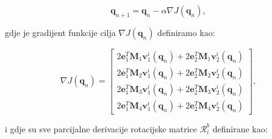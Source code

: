\documentclass[times, utf8, diplomski, numeric]{templates/template}
\begin{document}
{{{{                \begin{equation}
                \label{eq:grad_des}
                    \boldsymbol{q}_{n+1} = \boldsymbol{q}_n - \alpha\nabla J(\boldsymbol{q}_n),
                \end{equation}

                gdje je gradijent funkcije cilja $\nabla J(\boldsymbol{q}_n)$ definiramo kao:

                \begin{equation}
                    \nabla J(\boldsymbol{q}_n) = 
                    \begin{bmatrix}
                        2 \boldsymbol{e}_1^T \boldsymbol{M}_1 \boldsymbol{v}_1^i(\boldsymbol{q}_n) + 2 \boldsymbol{e}_2^T \boldsymbol{M}_1 \boldsymbol{v}_2^i(\boldsymbol{q}_n) \\
                        2 \boldsymbol{e}_1^T \boldsymbol{M}_2 \boldsymbol{v}_1^i(\boldsymbol{q}_n) + 2 \boldsymbol{e}_2^T \boldsymbol{M}_2 \boldsymbol{v}_2^i(\boldsymbol{q}_n) \\
                        2 \boldsymbol{e}_1^T \boldsymbol{M}_3 \boldsymbol{v}_1^i(\boldsymbol{q}_n) + 2 \boldsymbol{e}_2^T \boldsymbol{M}_3 \boldsymbol{v}_2^i(\boldsymbol{q}_n) \\
                        2 \boldsymbol{e}_1^T \boldsymbol{M}_4 \boldsymbol{v}_1^i(\boldsymbol{q}_n) + 2 \boldsymbol{e}_2^T \boldsymbol{M}_4 \boldsymbol{v}_2^i(\boldsymbol{q}_n)
                    \end{bmatrix}
                    ,
                \end{equation}

                i gdje su sve parcijalne derivacije rotacijske matrice $\mathcal{R}_i^b$ definirane kao:

}}}}
\end{document}
